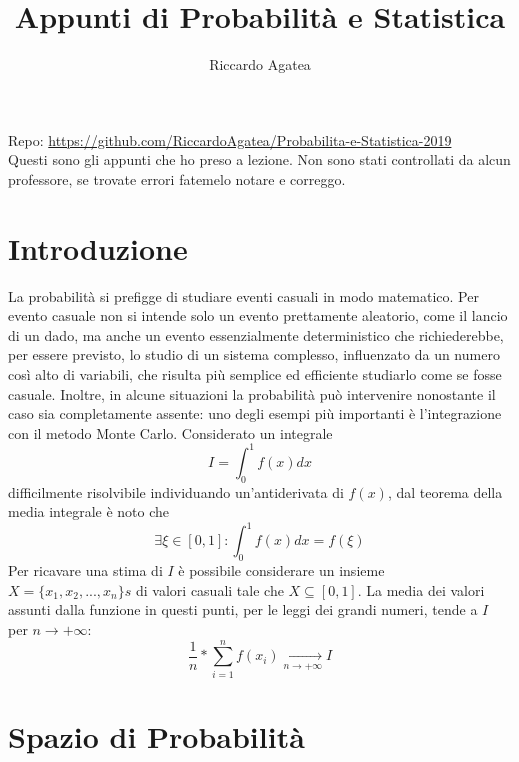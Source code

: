 \documentclass{article}
\title{Appunti di Probabilità e Statistica}
\author{Riccardo Agatea}
\date{}
\theoremstyle{plain}
\theoremstyle{definition}
\theoremstyle{remark}
\begin{document}
\maketitle
\begin{center}
	Repo: \url{https://github.com/RiccardoAgatea/Probabilita-e-Statistica-2019}\\
	Questi sono gli appunti che ho preso a lezione. Non sono stati controllati da alcun professore, se trovate errori fatemelo notare e correggo.
\end{center}
\newpage
{}
\tableofcontents
\newpage
{}
\section{Introduzione} %
\label{sec:introduzione}
La probabilità si prefigge di studiare eventi casuali in modo matematico. Per evento casuale non si intende solo un evento prettamente aleatorio, come il lancio di un dado, ma anche un evento essenzialmente deterministico che richiederebbe, per essere previsto, lo studio di un sistema complesso, influenzato da un numero così alto di variabili, che risulta più semplice ed efficiente studiarlo come se fosse casuale. Inoltre, in alcune situazioni la probabilità può intervenire nonostante il caso sia completamente assente: uno degli esempi più importanti è l'integrazione con il metodo Monte Carlo. Considerato un integrale
\begin{equation*}
	I=\int_0^1 f(x)dx
\end{equation*}
difficilmente risolvibile individuando un'antiderivata di $f(x)$, dal teorema della media integrale è noto che
\begin{equation*}
	\exists\xi\in [0,1]\colon\int_0^1 f(x)dx=f(\xi)
\end{equation*}
Per ricavare una stima di $I$ è possibile considerare un insieme $X=\{x_1,x_2,...,x_n\}s$ di valori casuali tale che $X\subseteq [0,1]$. La media dei valori assunti dalla funzione in questi punti, per le leggi dei grandi numeri, tende a $I$ per $n\to+\infty$:
\begin{equation*}
	\frac{1}{n}*\sum_{i=1}^{n}f(x_i)\xrightarrow[n\to+\infty]{}I
\end{equation*}
\section{Spazio di Probabilità} %
\label{sec:spazio_di_probabilità}
\end{document}

